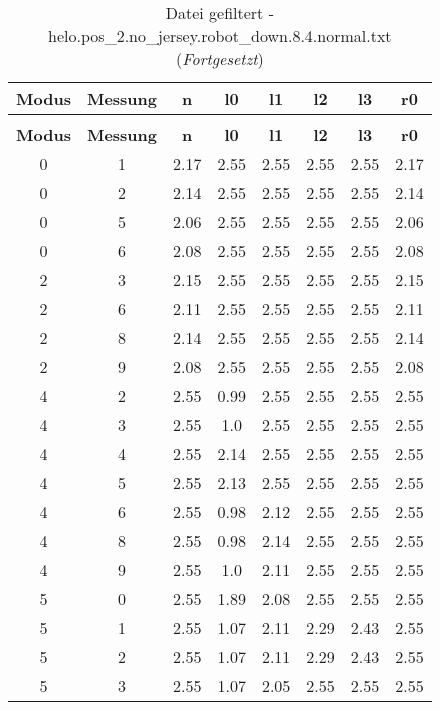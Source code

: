 \clearpage{}
\begin{longtable}{|c|c||c||c|c|c|c||c|}
	\caption{Datei gefiltert - helo.pos\_2.no\_jersey.robot\_down.8.4.normal.txt} \label{tab:helo.pos-2.no-jersey.robot-down.8.4.normal.txt} \\ \hline
	\textbf{Modus} & \textbf{Messung} & \textbf{n} & \textbf{l0} & \textbf{l1} & \textbf{l2} & \textbf{l3} & \textbf{r0}\\ \hline
	\endfirsthead
	\caption[]{Datei gefiltert - helo.pos\_2.no\_jersey.robot\_down.8.4.normal.txt (\emph{Fortgesetzt})} \\ \hline
	\textbf{Modus} & \textbf{Messung} & \textbf{n} & \textbf{l0} & \textbf{l1} & \textbf{l2} & \textbf{l3} & \textbf{r0}\\ \hline
	\endhead
	0 & 1 & 2.17 & 2.55 & 2.55 & 2.55 & 2.55 & 2.17 \\ \hline
	0 & 2 & 2.14 & 2.55 & 2.55 & 2.55 & 2.55 & 2.14 \\ \hline
	0 & 5 & 2.06 & 2.55 & 2.55 & 2.55 & 2.55 & 2.06 \\ \hline
	0 & 6 & 2.08 & 2.55 & 2.55 & 2.55 & 2.55 & 2.08 \\ \hline
	2 & 3 & 2.15 & 2.55 & 2.55 & 2.55 & 2.55 & 2.15 \\ \hline
	2 & 6 & 2.11 & 2.55 & 2.55 & 2.55 & 2.55 & 2.11 \\ \hline
	2 & 8 & 2.14 & 2.55 & 2.55 & 2.55 & 2.55 & 2.14 \\ \hline
	2 & 9 & 2.08 & 2.55 & 2.55 & 2.55 & 2.55 & 2.08 \\ \hline
	4 & 2 & 2.55 & 0.99 & 2.55 & 2.55 & 2.55 & 2.55 \\ \hline
	4 & 3 & 2.55 & 1.0 & 2.55 & 2.55 & 2.55 & 2.55 \\ \hline
	4 & 4 & 2.55 & 2.14 & 2.55 & 2.55 & 2.55 & 2.55 \\ \hline
	4 & 5 & 2.55 & 2.13 & 2.55 & 2.55 & 2.55 & 2.55 \\ \hline
	4 & 6 & 2.55 & 0.98 & 2.12 & 2.55 & 2.55 & 2.55 \\ \hline
	4 & 8 & 2.55 & 0.98 & 2.14 & 2.55 & 2.55 & 2.55 \\ \hline
	4 & 9 & 2.55 & 1.0 & 2.11 & 2.55 & 2.55 & 2.55 \\ \hline
	5 & 0 & 2.55 & 1.89 & 2.08 & 2.55 & 2.55 & 2.55 \\ \hline
	5 & 1 & 2.55 & 1.07 & 2.11 & 2.29 & 2.43 & 2.55 \\ \hline
	5 & 2 & 2.55 & 1.07 & 2.11 & 2.29 & 2.43 & 2.55 \\ \hline
	5 & 3 & 2.55 & 1.07 & 2.05 & 2.55 & 2.55 & 2.55 \\ \hline

\end{longtable}
